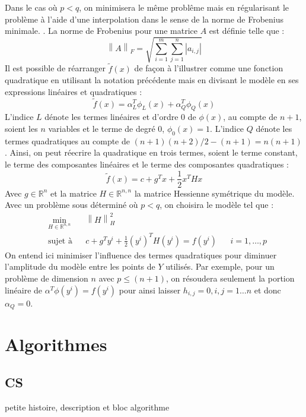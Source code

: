\documentclass[letterpaper]{scrartcl}
\newcommand{\R}{\mathbb{R}}
\newcommand{\norm}[1]{\left\lVert#1\right\rVert}
\begin{document}
Dans le cas où $p<q$, on minimisera le même problême mais en régularisant le problème à l'aide d'une interpolation dans le sense de la norme de Frobenius minimale. \cite{MoWi2009} \cite{CuRoVi10}. La norme de Frobenius pour une matrice $A$ est définie telle que : 
\begin{equation*}
	\norm{A}_F = \sqrt{\overset{m}{\underset{i=1}{\sum}} \overset{n}{\underset{j=1}{\sum}}|a_{i,j}|}
\end{equation*}
Il est possible de réarranger $\tilde{f}(x)$ de façon à l'illustrer comme une fonction quadratique en utilisant la notation précédente mais en divisant le modèle en ses expressions linéaires et quadratiques : 
\begin{equation*}
\tilde{f}(x) = \alpha_{L}^{T}\phi_L(x) + \alpha_{Q}^{T}\phi_Q(x)
\end{equation*}
L'indice $L$ dénote les termes linéaires et d'ordre 0 de $\phi(x)$, au compte de $n+1$, soient les $n$ variables et le terme de degré 0, $\phi_0(x)=1$. L'indice $Q$ dénote les termes quadratiques au compte de $(n+1)(n+2)/2 - (n+1) = n(n+1)$. Ainsi, on peut réecrire la quadratique en trois termes, soient le terme constant, le terme des composantes linéaires et le terme des composantes quadratiques : 
\begin{equation*}
\tilde{f}(x) = c + g^T x + \frac{1}{2} x^T H x
\end{equation*}
Avec $g \in \R^n$ et la matrice $H\in \R^{n,n}$ la matrice Hessienne symétrique du modèle. Avec un problème sous déterminé où $p<q$, on choisira le modèle tel que :
\begin{align*}
	&\underset{H \in \R^{n,n}}{\text{min}}& &\norm{H}^2_H & &\\
	&\text{sujet à} & &c + g^T y^i + \frac{1}{2} (y^i)^T H (y^i) = f(y^i) & &i = 1,\dots, p
\end{align*}
On entend ici minimiser l'influence des termes quadratiques pour diminuer l'amplitude du modèle entre les points de $Y$ utilisés. Par exemple, pour un problème de dimension $n$ avec $p\leq(n+1)$, on résoudera seulement la portion linéaire de $\alpha ^T \phi(y^i) = f(y^i)$ pour ainsi laisser $h_{i,j}=0, i,j=1\dots n$ et donc $\alpha_{Q}=0$.

\section{Algorithmes}
	\subsection{CS}
	petite histoire, description et bloc algorithme
\end{document}
